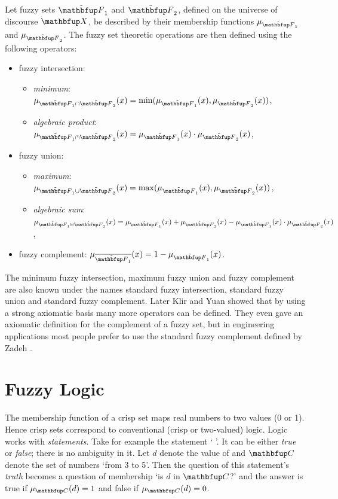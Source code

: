 \begin{definition}
Let fuzzy sets $\fset{F}_1$ and $\fset{F}_2$, defined on the universe of discourse $\set{X}$, be described by their membership functions $\mu_{\fset{F}_1}$ and $\mu_{\fset{F}_2}$. The fuzzy set theoretic operations are then defined using the following operators:

\begin{itemize}
\item fuzzy intersection:
  \begin{itemize}
    \item \emph{minimum}:  $\mu_{\fset{F}_1 \cap \fset{F}_2}(x)=\min(\mu_{\fset{F}_1}(x),\mu_{\fset{F}_2}(x))$,
    \item {\em algebraic product\/}:  $\mu_{\fset{F}_1 \aprod \fset{F}_2}(x)=\mu_{\fset{F}_1}(x)\cdot\mu_{\fset{F}_2}(x)$,
  \end{itemize}

\item fuzzy union:
  \begin{itemize}
    \item {\em maximum\/}:  $\mu_{\fset{F}_1 \cup \fset{F}_2}(x)=\max(\mu_{\fset{F}_1}(x),\mu_{\fset{F}_2}(x))$,
    \item {\em algebraic sum\/}:  $\mu_{\fset{F}_1 \uplus \fset{F}_2}(x)=\mu_{\fset{F}_1}(x)+\mu_{\fset{F}_2}(x)-\mu_{\fset{F}_1}(x)\cdot\mu_{\fset{F}_2}(x)$,
  \end{itemize}

\item fuzzy complement:  
  $\mu_{\overline{\fset{F}_1}}(x)=1-\mu_{\fset{F}_1}(x)$.

\end{itemize}
\end{definition}

The minimum fuzzy intersection, maximum fuzzy union and fuzzy complement are also known under the names standard fuzzy intersection, standard fuzzy union and standard fuzzy complement. Later Klir and Yuan \cite{klir:1995} showed that by using a strong axiomatic basis many more operators can be defined. They even gave an axiomatic definition for the complement of a fuzzy set, but in engineering applications most people prefer to use the standard fuzzy complement defined by Zadeh \cite{zadeh:1965}.  


\section{Fuzzy Logic}
\label{sec:fuzzyModelling:fuzzyLogic}
The membership function of a crisp set maps real numbers to two values (0 or 1). Hence crisp sets correspond to conventional (crisp or two-valued) logic. Logic works with \emph{statements}. Take for example the statement `  '. It can be either \emph{true} or \emph{false}; there is no ambiguity in it. Let $d$ denote the value of  and $\set{C}$ denote the set of numbers `from 3 to 5'. Then the question of this statement's \emph{truth} becomes a question of membership `is $d$ in $\set{C}$?' and the answer is true if $\mu_\set{C}(d)=1$ and false if $\mu_\set{C}(d)=0$. 

